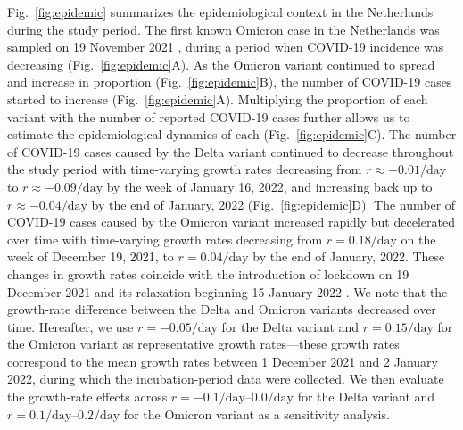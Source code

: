 \documentclass[12pt]{article}
\newcommand{\fref}[1]{Fig.~\ref{fig:#1}}
\begin{document}
\fref{epidemic} summarizes the epidemiological context in the Netherlands during the study period.
The first known Omicron case in the Netherlands was sampled on 19 November 2021 \citep{backer2021omicron}, during a period when COVID-19 incidence was decreasing (\fref{epidemic}A).
As the Omicron variant continued to spread and increase in proportion (\fref{epidemic}B), the number of COVID-19 cases started to increase (\fref{epidemic}A).
Multiplying the proportion of each variant with the number of reported COVID-19 cases further allows us to estimate the epidemiological dynamics of each (\fref{epidemic}C).
The number of COVID-19 cases caused by the Delta variant continued to decrease throughout the study period with time-varying growth rates decreasing from $r \approx -0.01/\mathrm{day}$ to $r \approx -0.09/\mathrm{day}$ by the week of January 16, 2022, and increasing back up to $r \approx -0.04/\mathrm{day}$ by the end of January, 2022 (\fref{epidemic}D).
The number of COVID-19 cases caused by the Omicron variant increased rapidly but decelerated over time with time-varying growth rates decreasing from $r=0.18/\mathrm{day}$ on the week of December 19, 2021, to $r=0.04/\mathrm{day}$ by the end of January, 2022.
These changes in growth rates coincide with the introduction of lockdown on 19 December 2021 \citep{netherlandslockdown} and its relaxation beginning 15 January 2022 \citep{netherlandsrelax,netherlandsopen}.
We note that the growth-rate difference between the Delta and Omicron variants decreased over time.
Hereafter, we use $r=-0.05/\mathrm{day}$ for the Delta variant and $r=0.15/\mathrm{day}$ for the Omicron variant as representative growth rates---these growth rates correspond to the mean growth rates between 1 December 2021 and 2 January 2022, during which the incubation-period data were collected.
We then evaluate the growth-rate effects across $r=-0.1/\mathrm{day}$--$0.0/\mathrm{day}$ for the Delta variant and $r=0.1/\mathrm{day}$--$0.2/\mathrm{day}$ for the Omicron variant as a sensitivity analysis.
\end{document}
